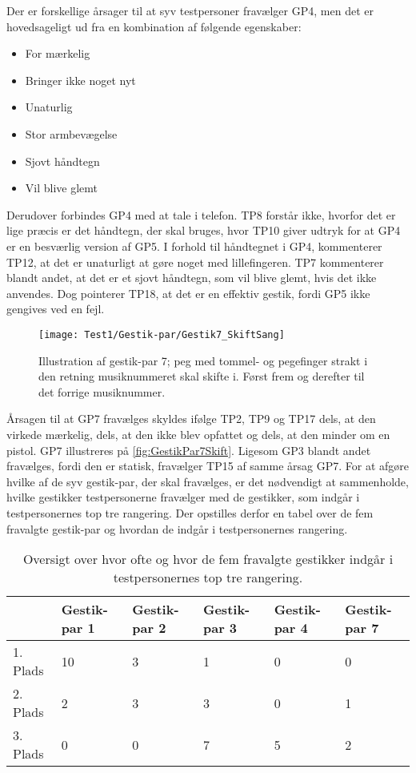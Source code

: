 \noindent
%
Der er forskellige årsager til at syv testpersoner fravælger GP4, men det er hovedsageligt ud fra en kombination af følgende egenskaber:
%
\begin{multicols}{3}
    \begin{itemize}
        \item For mærkelig
        \item Bringer ikke noget nyt
        \item Unaturlig
        \item Stor armbevægelse
        \item Sjovt håndtegn
        \item Vil blive glemt
\end{itemize}
\end{multicols}
\noindent
%
Derudover forbindes GP4 med at tale i telefon. TP8 forstår ikke, hvorfor det er lige præcis er det håndtegn, der skal bruges, hvor TP10 giver udtryk for at GP4 er en besværlig version af GP5. I forhold til håndtegnet i GP4, kommenterer TP12, at det er unaturligt at gøre noget med lillefingeren. TP7 kommenterer blandt andet, at det er et sjovt håndtegn, som vil blive glemt, hvis det ikke anvendes. Dog pointerer TP18, at det er en effektiv gestik, fordi GP5 ikke gengives ved en fejl.
%
\begin{figure}[H]
	\centering
	\texttt{[image: Test1/Gestik-par/Gestik7\_SkiftSang]}
	\caption{Illustration af gestik-par 7; peg med tommel- og pegefinger strakt i den retning musiknummeret skal skifte i. Først frem og derefter til det forrige musiknummer.}
	\label{fig:GestikPar7Skift}
\end{figure}
\noindent
% 
Årsagen til at GP7 fravælges skyldes ifølge TP2, TP9 og TP17 dels, at den virkede mærkelig, dels, at den ikke blev opfattet og dels, at den minder om en pistol. GP7 illustreres på \autoref{fig:GestikPar7Skift}. Ligesom GP3 blandt andet fravælges, fordi den er statisk, fravælger TP15 af samme årsag GP7.\blankline
%
For at afgøre hvilke af de syv gestik-par, der skal fravælges, er det nødvendigt at sammenholde, hvilke gestikker testpersonerne fravælger med de gestikker, som indgår i testpersonernes top tre rangering. Der opstilles derfor en tabel over de fem fravalgte gestik-par og hvordan de indgår i testpersonernes rangering.    
%
\begin{table}[H]
	\centering
	\begin{tabular}{ | p{1.5cm} | p{2.1cm} | p{2.1cm} | p{2.1cm} | p{2.1cm} | p{2.1cm} |}
	\hline
		 & Gestik-par 1 & Gestik-par 2 & Gestik-par 3 & Gestik-par 4 & Gestik-par 7 \\ \hline
		1. Plads & 10 & 3 & 1 & 0 & 0\\ \hline
		2. Plads & 2 & 3 & 3 & 0 & 1\\ \hline
		3. Plads & 0 & 0 & 7 & 5 & 2\\ \hline
	\end{tabular}
	\caption{Oversigt over hvor ofte og hvor de fem fravalgte gestikker indgår i testpersonernes top tre rangering.}
	\label{tab:FravalgteTopTreSkift}
\end{table}
